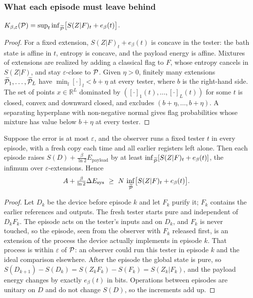 \subsubsection{What each episode must leave behind}

\begin{lemma}[Minimax]\label{ar:lem:minimax}
$K_{\beta,\varepsilon}(\mathcal P)=\sup_t\inf_{\widetilde{\mathcal P}}\bigl[S(Z|F)_t+e_\beta(t)\bigr]$.
\end{lemma}

\begin{proof}
For a fixed extension, $S(Z|F)_t+e_\beta(t)$ is concave in the tester: the bath state is affine in $t$, entropy is concave, and the payload energy is affine. Mixtures of extensions are realized by adding a classical flag to $F$, whose entropy cancels in $S(Z|F)$, and stay $\varepsilon$-close to $\mathcal P$. Given $\eta>0$, finitely many extensions $\widetilde{\mathcal P}_1,\dots,\widetilde{\mathcal P}_L$ have $\min_l[\cdot]_l<b+\eta$ at every tester, where $b$ is the right-hand side. The set of points $x\in\mathbb R^L$ dominated by $([\cdot]_1(t),\dots,[\cdot]_L(t))$ for some $t$ is closed, convex and downward closed, and excludes $(b+\eta,\dots,b+\eta)$. A separating hyperplane with non-negative normal gives flag probabilities whose mixture has value below $b+\eta$ at every tester.
\end{proof}

\begin{lemma}\label{ar:lem:accumulation}
Suppose the error is at most $\varepsilon$, and the observer runs a fixed tester $t$ in every episode, with a fresh copy each time and all earlier registers left alone. Then each episode raises $S(D)+\frac{\beta}{\ln2}E_{\mathrm{payload}}$ by at least $\inf_{\widetilde{\mathcal P}}[S(Z|F)_t+e_\beta(t)]$, the infimum over $\varepsilon$-extensions. Hence
\[
A+\tfrac{\beta}{\ln2}\Delta E_{\mathrm{sys}}\ \ge\ N\,\inf_{\Pt}\bigl[S(Z|F)_t+e_\beta(t)\bigr].
\]
\end{lemma}

\begin{proof}
Let $D_k$ be the device before episode $k$ and let $F_k$ purify it; $F_k$ contains the earlier references and outputs. The fresh tester starts pure and independent of $D_kF_k$. The episode acts on the tester's inputs and on $D_k$, and $F_k$ is never touched, so the episode, seen from the observer with $F_k$ released first, is an extension of the process the device actually implements in episode $k$. That process is within $\varepsilon$ of $\mathcal P$: an observer could run this tester in episode $k$ and the ideal comparison elsewhere. After the episode the global state is pure, so $S(D_{k+1})-S(D_k)=S(Z_kF_k)-S(F_k)=S(Z_k|F_k)$, and the payload energy changes by exactly $e_\beta(t)$ in bits. Operations between episodes are unitary on $D$ and do not change $S(D)$, so the increments add up.
\end{proof}


